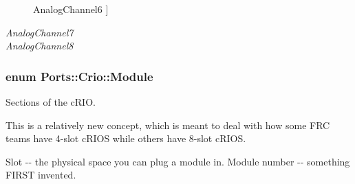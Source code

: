 \begin{Desc}
\begin{description}
{\hypertarget{namespace_ports_1_1_crio_a7559819d31079e0677b999150af1b1b1a013309228793baa3f0545e44e0c0aa83}{\-Analog\-Channel6}\label{namespace_ports_1_1_crio_a7559819d31079e0677b999150af1b1b1a013309228793baa3f0545e44e0c0aa83}
}]\item[{\em 
\hypertarget{namespace_ports_1_1_crio_a7559819d31079e0677b999150af1b1b1a5420e4fb8eeb5b15081ba27a881e54d6}{\-Analog\-Channel7}\label{namespace_ports_1_1_crio_a7559819d31079e0677b999150af1b1b1a5420e4fb8eeb5b15081ba27a881e54d6}
}]\item[{\em 
\hypertarget{namespace_ports_1_1_crio_a7559819d31079e0677b999150af1b1b1a1abd070d1aadd566432dd6d5634898d9}{\-Analog\-Channel8}\label{namespace_ports_1_1_crio_a7559819d31079e0677b999150af1b1b1a1abd070d1aadd566432dd6d5634898d9}
}]\end{description}
\end{Desc}

\hypertarget{namespace_ports_1_1_crio_aa86b9e625abfa5049c7e1570b31cc56e}{
\subsubsection[{\-Module}]{\setlength{\rightskip}{0pt plus 5cm}enum {\bf \-Ports\-::\-Crio\-::\-Module}}}\label{namespace_ports_1_1_crio_aa86b9e625abfa5049c7e1570b31cc56e}


\-Sections of the c\-R\-I\-O. 

\-This is a relatively new concept, which is meant to deal with how some \-F\-R\-C teams have 4-\/slot c\-R\-I\-O\-S while others have 8-\/slot c\-R\-I\-O\-S.

\-Slot -\/-\/ the physical space you can plug a module in. \-Module number -\/-\/ something \-F\-I\-R\-S\-T invented.

